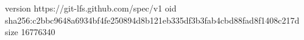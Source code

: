 version https://git-lfs.github.com/spec/v1
oid sha256:c2bbc9648a6934bf4fe250894d8b121eb335df3b3fab4cbd88fad8f1408c217d
size 16776340
